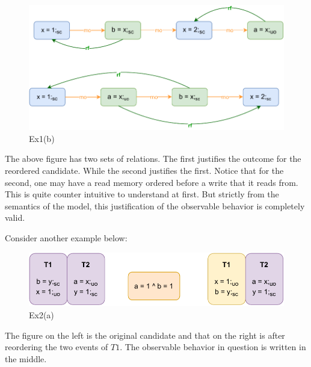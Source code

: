         \begin{figure}[H]
            \centering
            \includegraphics[scale=0.7]{5.InstructionReordering/ReorderingExample1(b).pdf}
            \caption{Ex1(b)} 
        \end{figure}

        The above figure has two sets of relations. The first justifies the outcome for the reordered candidate. While the second justifies the first. 
        Notice that for the second, one may have a read memory ordered before a write that it reads from. 
        This is quite counter intuitive to understand at first. 
        But strictly from the semantics of the model, this justification of the observable behavior is completely valid. 

        Consider another example below:

        \begin{figure}[H]
            \centering
            \includegraphics[scale=0.7]{5.InstructionReordering/ReorderingExample2(a).pdf}
            \caption{Ex2(a)} 
        \end{figure}

        The figure on the left is the original candidate and that on the right is after reordering the two events of $T1$.
        The observable behavior in question is written in the middle. 

